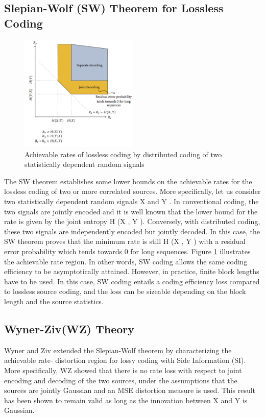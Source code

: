\documentclass[letterpaper,12pt,titlepage,oneside,final]{report}
\begin{document}
        \subsection{Slepian-Wolf (SW) Theorem for Lossless Coding}
            \begin{figure}[!h]
                \centering
                \includegraphics[width=0.5\textwidth]{swtheory}
                \caption{Achievable rates of lossless coding by distributed coding of two statistically dependent random signals\cite{Dufaux2009}}
                \label{swtheory}
            \end{figure}
            The SW theorem establishes some lower bounds on the achievable rates for the lossless coding of two or more correlated sources. More specifically, let us consider two statistically dependent random signals X and Y . In conventional coding, the two signals are jointly encoded and it is well known that the lower bound for the rate is given by the joint entropy H (X , Y ). Conversely, with distributed coding, these two signals are independently encoded but jointly decoded. In this case, the SW theorem proves that the minimum rate is still H (X , Y ) with a residual error probability which tends towards 0 for long sequences. Figure \ref{swtheory} illustrates the achievable rate region. In other words, SW coding allows the same coding efficiency to be asymptotically attained. However, in practice, finite block lengths have to be used. In this case, SW coding entails a coding efficiency loss compared to lossless source coding, and the loss can be sizeable depending on the block length and the source statistics.
        \subsection{Wyner-Ziv(WZ) Theory}
            Wyner and Ziv extended the Slepian-Wolf theorem by characterizing the achievable rate- distortion region for lossy coding with Side Information (SI). More specifically, WZ showed that there is no rate loss with respect to joint encoding and decoding of the two sources, under the assumptions that the sources are jointly Gaussian and an MSE distortion measure is used. This result has been shown to remain valid as long as the innovation between X and Y is Gaussian.
\end{document}

